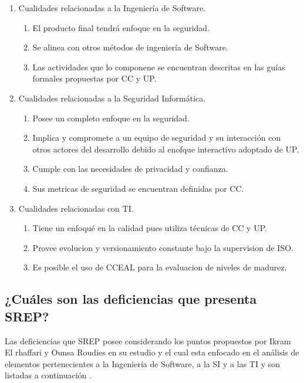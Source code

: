 \documentclass[runningheads,a4paper]{llncs}
\begin{document}
\begin{enumerate}
	\item Cualidades relacionadas a la Ingeniería de \gls{Software}.
		\begin{enumerate}
			\item El producto final tendrá enfoque en la seguridad.
			\item Se alinea con otros métodos de ingeniería de \gls{Software}.
			\item Las actividades que lo componene se encuentran descritas en las guías formales propuestas por \gls{CC} y \gls{UP}.\\
			
		\end{enumerate}
	\item Cualidades relacionadas a la Seguridad Informática.
		\begin{enumerate}
			\item Posee un completo enfoque en la seguridad.
			\item Implica y compromete a un equipo de seguridad y su interacción con otros actores del desarrollo debido al enofque interactivo adoptado de \gls{UP}.
			\item Cumple con las necesidades de privacidad y confianza.
			\item Sus metricas de seguridad se encuentran definidas por \gls{CC}.\\

		\end{enumerate}
	\item Cualidades relacionadas con \gls{TI}.
		\begin{enumerate}
			\item Tiene un enfoqué en la calidad pues utiliza técnicas de \gls{CC} y \gls{UP}. 
			\item Provee evolucion y versionamiento constante bajo la supervision de \gls{ISO}.
			\item Es posible el uso de \gls{CCEAL} para la evaluacion de niveles de madurez.
		\end{enumerate}
\end{enumerate}

\subsection{¿Cuáles son las deficiencias que presenta \gls{SREP}?}
Las deficiencias que \gls{SREP} posee considerando los puntos propuestos por Ikram El rhaffari y Ounsa Roudies en su estudio y el cual esta enfocado en el análisis de elementos pertenecientes a la Ingeniería de \gls{Software}, a la \gls{SI} y a las \gls{TI} y son listadas a continuación \cite{BenchmarkingSDLCLAPS}.
\end{document}
